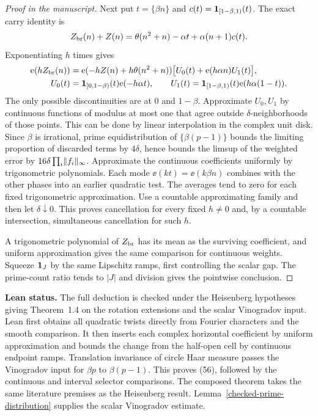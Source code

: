 \begin{proof}[Proof in the manuscript]
Next put $t=\{\beta n\}$ and $c(t)=\mathbf 1_{[1-\beta,1)}(t)$.
The exact carry identity is
\[
 Z_{\rm br}(n)+Z(n)=\theta(n^2+n)-\alpha t+\alpha(n+1)c(t).
\]
Exponentiating $h$ times gives
\begin{align*}
 \mathrm e(h Z_{\rm br}(n))
 &=\mathrm e(-hZ(n)+h\theta(n^2+n))\bigl[U_0(t)+\mathrm e(h\alpha n)U_1(t)\bigr],\\
 U_0(t)&=\mathbf 1_{[0,1-\beta)}(t)\mathrm e(-h\alpha t),\qquad
 U_1(t)=\mathbf 1_{[1-\beta,1)}(t)\mathrm e(h\alpha(1-t)).
\end{align*}
The only possible discontinuities are at $0$ and $1-\beta$.
Approximate $U_0,U_1$ by continuous functions of modulus at
most one that agree outside $\delta$-neighborhoods of those
points. This can be done by linear interpolation in the complex
unit disk. Since $\beta$ is irrational, prime equidistribution
of $\{\beta(p-1)\}$ bounds the limiting proportion of discarded
terms by $4\delta$, hence bounds the limsup of the weighted
error by $16\delta\prod_i\lVert f_i\rVert_\infty$. Approximate the
continuous coefficients uniformly by trigonometric polynomials.
Each mode $\ee(kt)=\ee(k\beta n)$ combines with the other
phases into an earlier quadratic test. The averages tend to zero
for each fixed trigonometric approximation. Use a countable
approximating family and then let $\delta\downarrow0$.
This proves cancellation for every fixed $h\ne0$ and, by a
countable intersection, simultaneous cancellation for such $h$.

A trigonometric polynomial of $Z_{\rm br}$ has its mean
as the surviving coefficient, and uniform approximation gives the
same comparison for continuous weights. Squeeze $\mathbf 1_J$
by the same Lipschitz ramps, first controlling the scalar gap.
The prime-count ratio tends to $|J|$ and division gives the
pointwise conclusion.
\end{proof}
\noindent\textbf{Lean status.} The full deduction is checked
under the Heisenberg hypotheses giving Theorem~1.4 on the rotation
extensions and the scalar Vinogradov input. Lean first obtains all
quadratic twists directly from Fourier characters and the smooth
comparison. It then inserts each complex horizontal coefficient by
uniform approximation and bounds the change from the half-open cell
by continuous endpoint ramps. Translation invariance of circle Haar
measure passes the Vinogradov input for $\beta p$ to $\beta(p-1)$.
This proves (56), followed by the continuous and interval selector
comparisons. The composed theorem takes the same literature premises
as the Heisenberg result. Lemma~\ref{checked-prime-distribution}
supplies the scalar Vinogradov estimate.

